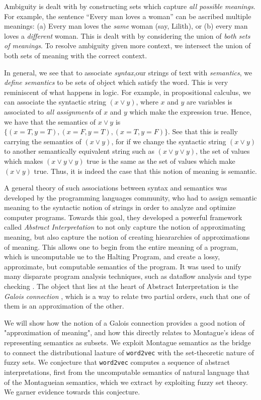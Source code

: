 \documentclass[11pt]{book}
\begin{document}
Ambiguity is dealt with by constructing sets which capture \emph{all possible
meanings}.  For example, the sentence ``Every man loves a woman'' can be ascribed
multiple meanings: (a) Every man loves the \emph{same} woman (say, Lilith), or
(b) every man loves a \emph{different} woman. This is dealt with by considering
the union of \emph{both sets of meanings}. To resolve ambiguity given more
context, we intersect the union of both sets of meaning with the correct context.

In general, we see that to associate \emph{syntax},our strings of text with
\emph{semantics}, we \emph{define semantics} to be sets of object which satisfy the word.
This is very reminiscent of what happens in logic. For example, in propositional calculus,
we can associate the syntactic string
$(x \lor y)$, where $x$ and $y$ are variables is associated to \emph{all assignments} of $x$ and $y$ which make
the expression true. Hence, we have that the semantics of $x \lor y$ is $\{ (x=T, y=T), (x=F, y=T), (x=T, y=F) \}$.
See that this is really carrying the semantics of $(x \lor y)$, for if we change
the syntactic string $(x \lor y)$ to another semantically equivalent string such
as $(x \lor y \lor y)$, the set of values which makes $(x \lor y \lor y)$ true is
the same as the set of values which make $(x \lor y)$ true. Thus, it is indeed the case
that this notion of meaning is semantic.

A general theory of such associations between syntax and semantics 
was developed by the programming languages community, who had to assign semantic
meaning to the syntactic notion of strings in order to analyze and optimize 
computer programs. Towards this goal, they developed a powerful framework
called \emph{Abstract Interpretation} \cite{cousot1977abstract} to not
only capture the notion of approximating meaning, but also capture the notion of
creating hieararchies of approximations of meaning. This allows one to
begin from the entire meaning of a program, which is uncomputable ue to the Halting Program,
and create a lossy, approximate, but computable semantics of the program.
It was used to unify many disparate program analysis techniques, such as
dataflow analysis \cite{khedker2017data} and type checking \cite{file1991abstract}. 
The object that lies at the heart of Abstract Interpretation is the \emph{Galois connection} 
\cite{cousot1992comparing}, which is a way to relate two partial orders, such
that one of them is an approximation of the other. 


We will show how the notion of a Galois connection provides a good notion of
"approximation of meaning", and how this directly relates to Montague's ideas
of representing semantics as subsets.  We exploit Montague semantics as the
bridge to connect the distributional laature of \texttt{word2vec} with the
set-theoretic nature of fuzzy sets. We conjecture that \texttt{word2vec}
computes a sequence of abstract interpretations, first from the uncomputable
semantics of natural language that of the Montagueian semantics, which we
extract by exploiting fuzzy set theory. We garner evidence towards this
conjecture.
\end{document}
